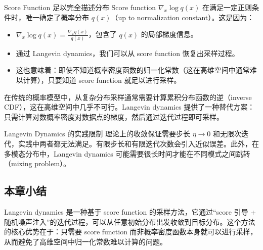 \begin{importantbox}{Score Function 足以完全描述分布}
Score function $\nabla_x \log q(x)$ 在满足一定正则条件时，唯一确定了概率分布 $q(x)$（up to normalization constant）。这是因为：
\begin{itemize}
    \item $\nabla_x \log q(x) = \frac{\nabla_x q(x)}{q(x)}$，包含了 $q(x)$ 的局部梯度信息。
    \item 通过 Langevin dynamics，我们可以从 score function 恢复出采样过程。
    \item 这也意味着：即使不知道概率密度函数的归一化常数（这在高维空间中通常难以计算），只要知道 score function 就足以进行采样。
\end{itemize}
\end{importantbox}

在传统的概率模型中，从复杂分布采样通常需要计算累积分布函数的逆（inverse CDF），这在高维空间中几乎不可行。Langevin dynamics 提供了一种替代方案：只需计算对数概率密度对数据点的梯度，然后通过迭代过程即可采样。

\begin{warningbox}{Langevin Dynamics 的实践限制}
理论上的收敛保证需要步长 $\eta \to 0$ 和无限次迭代，实践中两者都无法满足。有限步长和有限迭代次数会引入近似误差。此外，在多模态分布中，Langevin dynamics 可能需要很长时间才能在不同模式之间跳转（mixing problem）。
\end{warningbox}

\subsection{本章小结}

Langevin dynamics 是一种基于 score function 的采样方法，它通过``score 引导 + 随机噪声注入''的迭代过程，可以从任意初始分布出发收敛到目标分布。这个方法的核心优势在于：只需要 score function 而非概率密度函数本身就可以进行采样，从而避免了高维空间中归一化常数难以计算的问题。

